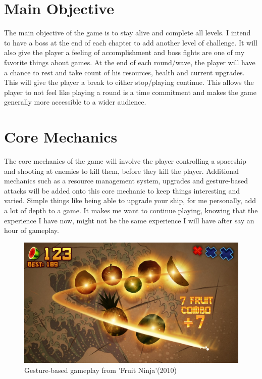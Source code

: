 \documentclass[a4paper]{scrreprt}
\begin{document}
  \clearpage
\section{Main Objective}
The main objective of the game is to stay alive and complete all levels. I intend to have a boss at the end of each chapter to add another level of challenge. It will also give the player a feeling of accomplishment and boss fights are one of my favorite things about games. At the end of each round/wave, the player will have a chance to rest and take count of his resources, health and current upgrades.
This will give the player a break to either stop/playing continue. This allows the player to not feel like playing a round is a time commitment and makes the game generally more accessible to a wider audience.



\section{Core Mechanics}
The core mechanics of the game will involve the player controlling a spaceship and shooting at enemies to kill them, before they kill the player. Additional mechanics such as a resource management system, upgrades
and gesture-based attacks will be added onto this core mechanic to keep things interesting and varied. Simple things like being able to upgrade your ship, for me personally, add a lot 
of depth to a game. It makes me want to continue playing, knowing that the experience I have now, might not be the same experience I will have after say an hour of gameplay.
\begin{figure}[h!]
  \centering
  \includegraphics[width=1\textwidth]{FruitNinja}
  \caption{Gesture-based gameplay from 'Fruit Ninja'(2010)}
  \end{figure}
\end{document}
